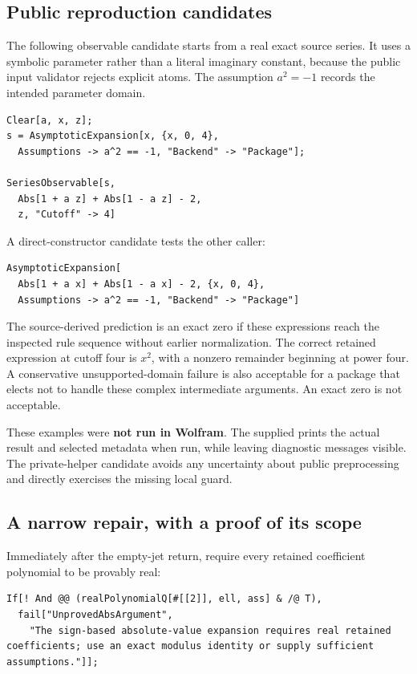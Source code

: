 \documentclass[11pt,letterpaper]{article}
\newcommand{\code}[1]{\texttt{\detokenize{#1}}}
\begin{document}
\subsection{Public reproduction candidates}

The following observable candidate starts from a real exact source series. It uses a symbolic parameter rather than a literal imaginary constant, because the public input validator rejects explicit \code{Complex} atoms. The assumption $a^2=-1$ records the intended parameter domain.

\begin{lstlisting}
Clear[a, x, z];
s = AsymptoticExpansion[x, {x, 0, 4},
  Assumptions -> a^2 == -1, "Backend" -> "Package"];

SeriesObservable[s,
  Abs[1 + a z] + Abs[1 - a z] - 2,
  z, "Cutoff" -> 4]
\end{lstlisting}

A direct-constructor candidate tests the other caller:
\begin{lstlisting}
AsymptoticExpansion[
  Abs[1 + a x] + Abs[1 - a x] - 2, {x, 0, 4},
  Assumptions -> a^2 == -1, "Backend" -> "Package"]
\end{lstlisting}

The source-derived prediction is an exact zero if these expressions reach the inspected rule sequence without earlier normalization. The correct retained expression at cutoff four is $x^2$, with a nonzero remainder beginning at power four. A conservative unsupported-domain failure is also acceptable for a package that elects not to handle these complex intermediate arguments. An exact zero is not acceptable.

These examples were \textbf{not run in Wolfram}. The supplied  prints the actual result and selected metadata when run, while leaving diagnostic messages visible. The private-helper candidate avoids any uncertainty about public preprocessing and directly exercises the missing local guard.

\subsection{A narrow repair, with a proof of its scope}

Immediately after the empty-jet return, require every retained coefficient polynomial to be provably real:
\begin{lstlisting}
If[! And @@ (realPolynomialQ[#[[2]], ell, ass] & /@ T),
  fail["UnprovedAbsArgument",
    "The sign-based absolute-value expansion requires real retained coefficients; use an exact modulus identity or supply sufficient assumptions."]];
\end{lstlisting}
\end{document}
